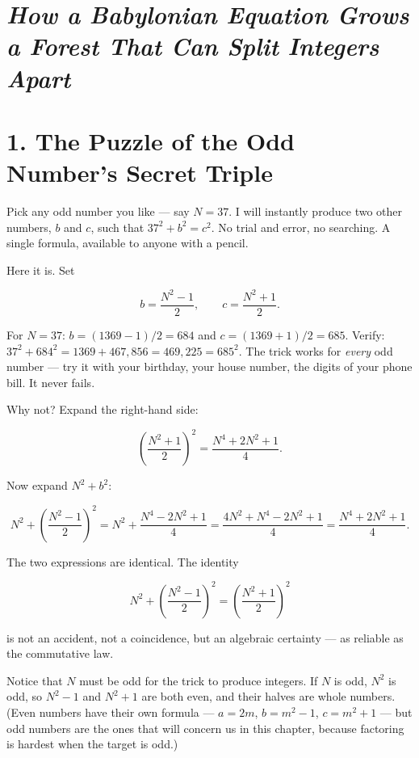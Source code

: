 \section{\texorpdfstring{\emph{How a Babylonian Equation Grows a Forest That Can Split Integers Apart}}{How a Babylonian Equation Grows a Forest That Can Split Integers Apart}}\label{ch14-how-a-babylonian-equation-grows-a-forest-that-can-split-integers-apart}



\section{1. The Puzzle of the Odd Number's Secret Triple}\label{ch14-the-puzzle-of-the-odd-numbers-secret-triple}

Pick any odd number you like --- say \(N = 37\). I will instantly produce two other numbers, \(b\) and \(c\), such that \(37^2 + b^2 = c^2\). No trial and error, no searching. A single formula, available to anyone with a pencil.

Here it is. Set

\[b = \frac{N^2 - 1}{2}, \qquad c = \frac{N^2 + 1}{2}.\]

For \(N = 37\): \(b = (1369 - 1)/2 = 684\) and \(c = (1369 + 1)/2 = 685\). Verify: \(37^2 + 684^2 = 1369 + 467{,}856 = 469{,}225 = 685^2\). The trick works for \emph{every} odd number --- try it with your birthday, your house number, the digits of your phone bill. It never fails.

Why not? Expand the right-hand side:

\[\left(\frac{N^2 + 1}{2}\right)^{\!2} = \frac{N^4 + 2N^2 + 1}{4}.\]

Now expand \(N^2 + b^2\):

\[N^2 + \left(\frac{N^2 - 1}{2}\right)^{\!2} = N^2 + \frac{N^4 - 2N^2 + 1}{4} = \frac{4N^2 + N^4 - 2N^2 + 1}{4} = \frac{N^4 + 2N^2 + 1}{4}.\]

The two expressions are identical. The identity

\[N^2 + \left(\frac{N^2 - 1}{2}\right)^{\!2} = \left(\frac{N^2 + 1}{2}\right)^{\!2}\]

is not an accident, not a coincidence, but an algebraic certainty --- as reliable as the commutative law.

Notice that \(N\) must be odd for the trick to produce integers. If \(N\) is odd, \(N^2\) is odd, so \(N^2 - 1\) and \(N^2 + 1\) are both even, and their halves are whole numbers. (Even numbers have their own formula --- \(a = 2m\), \(b = m^2 - 1\), \(c = m^2 + 1\) --- but odd numbers are the ones that will concern us in this chapter, because factoring is hardest when the target is odd.)

